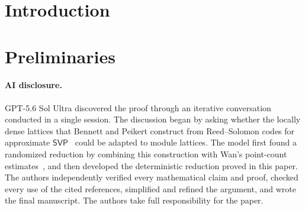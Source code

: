 \documentclass[11pt]{article}
\newcommand{\SVP}{\mathsf{SVP}}
\begin{document}
\hypersetup{pageanchor=true}
\setcounter{page}{1}

\section{Introduction}
\begingroup
{}

\endgroup

\section{Preliminaries}
\label{sec:preliminaries}







\paragraph{AI disclosure.}
GPT-5.6 Sol Ultra discovered the proof through an iterative conversation conducted in a single session. The discussion began by asking whether the locally dense lattices that Bennett and Peikert construct from Reed--Solomon codes for
approximate $\SVP$~\cite{BennettPeikert23} could be adapted to module lattices.  The model first found a randomized reduction by combining this construction with Wan's point-count estimates~\cite{wan2026np}, and then developed the deterministic reduction proved in this paper.  The authors independently verified every mathematical claim and proof, checked every use of the cited references, simplified and refined the argument, and wrote the final manuscript.  The authors take full responsibility for the paper.

\small


\end{document}
